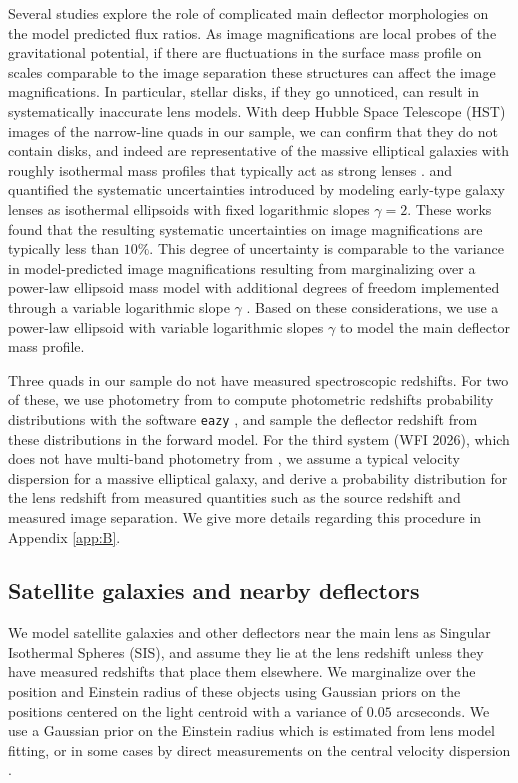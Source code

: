 Several studies \cite{EvansWitt03,Hsueh++16,Gilman++17,Hsueh++17,Hsueh++18} explore the role of complicated main deflector morphologies on the model predicted flux ratios. As image magnifications are local probes of the gravitational potential, if there are fluctuations in the surface mass profile on scales comparable to the image separation these structures can affect the image magnifications. In particular, stellar disks, if they go unnoticed, can result in systematically inaccurate lens models. With deep Hubble Space Telescope (HST) images of the narrow-line quads in our sample, we can confirm that they do not contain disks, and indeed are representative of the massive elliptical galaxies with roughly isothermal mass profiles that typically act as strong lenses \cite{Auger++10,Shankar++17}. \cite{Gilman++17} and \cite{Hsueh++18} quantified the systematic uncertainties introduced by modeling early-type galaxy lenses as isothermal ellipsoids with fixed logarithmic slopes $\gamma = 2$. These works found that the resulting systematic uncertainties on image magnifications are typically less than $10\%$. This degree of uncertainty is comparable to the variance in model-predicted image magnifications resulting from marginalizing over a power-law ellipsoid mass model with additional degrees of freedom implemented through a variable logarithmic slope $\gamma$ \cite{Nierenberg++19}. Based on these considerations, we use a power-law ellipsoid with variable logarithmic slopes $\gamma$ to model the main deflector mass profile.

Three quads in our sample do not have measured spectroscopic redshifts. For two of these, we use photometry from \cite{Shajib++18} to compute photometric redshifts probability distributions with the software {\tt{eazy}} \cite{Brammer++08}, and sample the deflector redshift from these distributions in the forward model. For the third system (WFI 2026), which does not have multi-band photometry from \cite{Shajib++18}, we assume a typical velocity dispersion for a massive elliptical galaxy, and derive a probability distribution for the lens redshift from measured quantities such as the source redshift and measured image separation. We give more details regarding this procedure in Appendix \ref{app:B}.    

\subsection{Satellite galaxies and nearby deflectors}
\label{ssec:satgals}
We model satellite galaxies and other deflectors near the main lens as Singular Isothermal Spheres (SIS), and assume they lie at the lens redshift unless they have measured redshifts that place them elsewhere. We marginalize over the position and Einstein radius of these objects using Gaussian priors on the positions centered on the light centroid with a variance of $0.05$ arcseconds. We use a Gaussian prior on the Einstein radius which is estimated from lens model fitting, or in some cases by direct measurements on the central velocity dispersion \cite[e.g.][]{Wong++17,Rusu++19}. 

